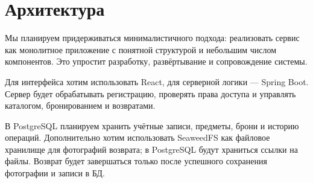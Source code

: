 \documentclass[a4paper,12pt]{article}
\begin{document}
\section{Архитектура}
Мы планируем придерживаться минималистичного подхода: реализовать сервис как монолитное приложение с понятной структурой и небольшим числом компонентов. Это упростит разработку, развёртывание и сопровождение системы.

Для интерфейса хотим использовать React, для серверной логики --- Spring Boot. Сервер будет обрабатывать регистрацию, проверять права доступа и управлять каталогом, бронированием и возвратами.

В PostgreSQL планируем хранить учётные записи, предметы, брони и историю операций. Дополнительно хотим использовать SeaweedFS как файловое хранилище для фотографий возврата; в PostgreSQL будут храниться ссылки на файлы. Возврат будет завершаться только после успешного сохранения фотографии и записи в БД.
\end{document}
